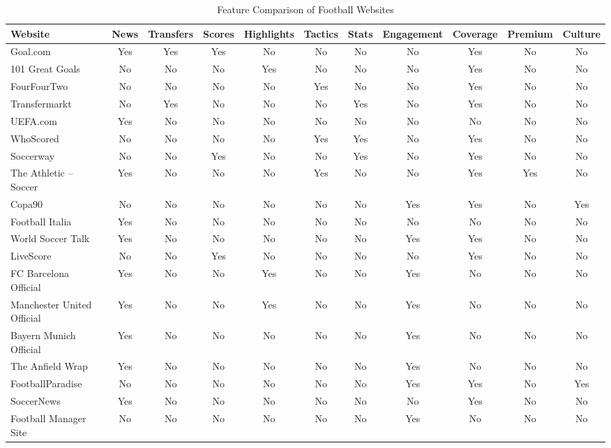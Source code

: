 \begin{table}[h!]
\centering
\caption{Feature Comparison of Football Websites}
\label{tab:feature-comparison}
\small %
\begin{tabularx}{\textwidth}{|l|c|c|c|c|c|c|c|c|c|c|}
\hline
\textbf{Website} & \textbf{News} & \textbf{Transfers} & \textbf{Scores} & \textbf{Highlights} & \textbf{Tactics} & \textbf{Stats} & \textbf{Engagement} & \textbf{Coverage} & \textbf{Premium} & \textbf{Culture} \\
\hline
Goal.com & Yes & Yes & Yes & No & No & No & No & Yes & No & No \\
101 Great Goals & No & No & No & Yes & No & No & No & Yes & No & No \\
FourFourTwo & No & No & No & No & Yes & No & No & Yes & No & No \\
Transfermarkt & No & Yes & No & No & No & Yes & No & Yes & No & No \\
UEFA.com & Yes & No & No & No & No & No & No & No & No & No \\
WhoScored & No & No & No & No & Yes & Yes & No & Yes & No & No \\
Soccerway & No & No & Yes & No & No & Yes & No & Yes & No & No \\
The Athletic – Soccer & Yes & No & No & No & Yes & No & No & Yes & Yes & No \\
Copa90 & No & No & No & No & No & No & Yes & Yes & No & Yes \\
Football Italia & Yes & No & No & No & No & No & No & No & No & No \\
World Soccer Talk & Yes & No & No & No & No & No & Yes & Yes & No & No \\
LiveScore & No & No & Yes & No & No & No & No & Yes & No & No \\
FC Barcelona Official & Yes & No & No & Yes & No & No & Yes & No & No & No \\
Manchester United Official & Yes & No & No & Yes & No & No & Yes & No & No & No \\
Bayern Munich Official & Yes & No & No & No & No & No & Yes & No & No & No \\
The Anfield Wrap & Yes & No & No & No & No & No & Yes & No & No & No \\
FootballParadise & No & No & No & No & No & No & Yes & Yes & No & Yes \\
SoccerNews & Yes & No & No & No & No & No & No & Yes & No & No \\
Football Manager Site & No & No & No & No & No & No & Yes & No & No & No \\

\end{tabularx}
\end{table}
